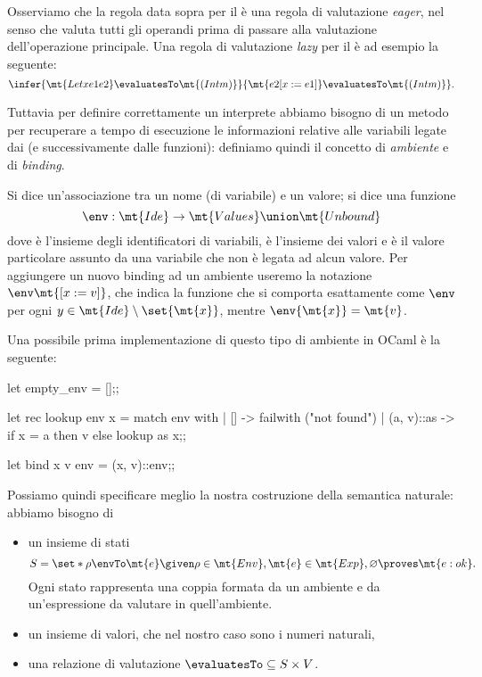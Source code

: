 Osserviamo che la regola data sopra per il  è una regola di valutazione \emph{eager}, nel senso che valuta tutti gli operandi prima di passare alla valutazione dell'operazione principale. Una regola di valutazione \emph{lazy} per il  è ad esempio la seguente: \[
    \infer{\mt{Let x e1 e2} \evaluatesTo \mt{(Int m)}}{\mt{e2[x := e1]} \evaluatesTo \mt{(Int m)}}.    
\]

Tuttavia per definire correttamente un interprete abbiamo bisogno di un metodo per recuperare a tempo di esecuzione le informazioni relative alle variabili legate dai  (e successivamente dalle funzioni): definiamo quindi il concetto di \emph{ambiente} e di \emph{binding}.

Si dice  un'associazione tra un nome (di variabile) e un valore; si dice  una funzione \[
    \env : \mt{Ide} \to \mt{Values} \union \mt{Unbound}    
\] dove  è l'insieme degli identificatori di variabili,  è l'insieme dei valori e  è il valore particolare assunto da una variabile che non è legata ad alcun valore. Per aggiungere un nuovo binding ad un ambiente useremo la notazione $\env\mt{[x := v]}$, che indica la funzione che si comporta esattamente come $\env$ per ogni $y \in \mt{Ide} \setminus \set{\mt{x}}$, mentre $\env{\mt{x}} = \mt{v}$.

Una possibile prima implementazione di questo tipo di ambiente in OCaml è la seguente:
\begin{OCaml}
    let empty_env = [];;

    let rec lookup env x = 
        match env with
        | []         -> failwith ("not found")
        | (a, v)::as -> if x = a then v
                                 else lookup as x;;
    
    let bind x v env = (x, v)::env;;
\end{OCaml}

Possiamo quindi specificare meglio la nostra costruzione della semantica naturale: abbiamo bisogno di \begin{itemize}
    \item un insieme di stati \[
        S = \set*{\rho \envTo \mt{e} \given \rho \in \mt{Env}, \mt{e} \in \mt{Exp}, \varnothing \proves \mt{e : ok}}.
    \] Ogni stato rappresenta una coppia formata da un ambiente e da un'espressione da valutare in quell'ambiente.
    \item un insieme di valori, che nel nostro caso sono i numeri naturali,
    \item una relazione di valutazione $\evaluatesTo \subseteq S \times V$.
\end{itemize}

